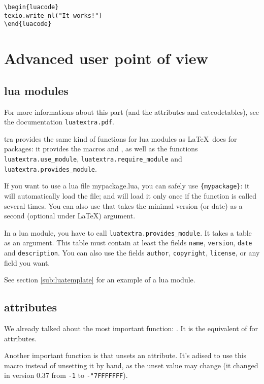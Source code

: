 \documentclass{article}
\begin{document}
\begin{verbatim}
\begin{luacode}
texio.write_nl("It works!")
\end{luacode}
\end{verbatim}

\section{Advanced user point of view}

\subsection{lua modules}

For more informations about this part (and the attributes and catcodetables),
see the documentation \texttt{luatextra.pdf}.

\LuaTeX tra provides the same kind of functions for lua modules as \LaTeX\
does for packages: it provides the macros \texttt{\string\luaUseModule} and
\texttt{\string\luaRequireModule}, as well as the functions
\texttt{luatextra.use\_module}, \texttt{luatextra.require\_module} and
\texttt{luatextra.provides\_module}.

If you want to use a lua file mypackage.lua, you can safely use
\texttt{\string\luaUseModule\{mypackage\}}: it will automatically load the
file; and will load it only once if the function is called several times. You
can also use \texttt{\string\luaRequireModule} that takes the minimal version
(or date) as a second (optional under \LaTeX ) argument.

In a lua module, you have to call \texttt{luatextra.provides\_module}. It
takes a table as an argument. This table must contain at least the fields
\texttt{name}, \texttt{version}, \texttt{date} and \texttt{description}. You
can also use the fields \texttt{author}, \texttt{copyright}, \texttt{license},
or any field you want.

See section \ref{sub:luatemplate} for an example of a lua module.

\subsection{attributes}

We already talked about the most important function:
\texttt{\string\newluaattribute}. It is the equivalent of
\texttt{\string\newcount} for attributes.

Another important function is \texttt{\string\unsetluaattribute} that unsets
an attribute. It's adised to use this macro instead of unsetting it by hand,
as the unset value may change (it changed in version 0.37 from \texttt{-1} to
\texttt{-"7FFFFFFF}).
\end{document}
